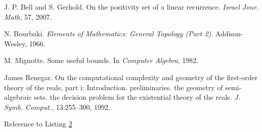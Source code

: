 \documentclass[10.8pt,oneside,reqno]{article}
\begin{document}
\begin{thebibliography}{9}

J. P. Bell and S. Gerhold. On the positivity set of a linear recurrence.
\textit{Israel Jour. Math}, 
57, 2007.

N. Bourbaki.
\textit{Elements of Mathematics: General Topology (Part 2)}. 
Addison-Wesley, 1966.

M. Mignotte. Some useful bounds. In 
\textit{Computer Algebra}, 
1982.


James Renegar. On the computational complexity and geometry of the first-order theory of the reals, part i: Introduction. preliminaries. the geometry of semi-algebraic sets. the decision problem for the existential theory of the reals. 
\textit{J. Symb. Comput.},
13:255–300, 1992.

Reference to Listing \color{blue}\hyperref[Listing:2]{2}

\end{thebibliography}
\end{document}
